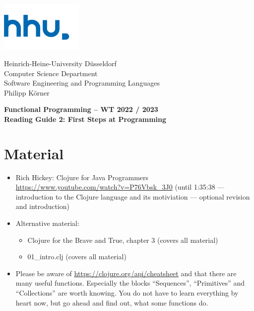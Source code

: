 \documentclass[11pt,a4paper]{article}
\begin{document}
\begin{minipage}[b]{\textwidth}
	\parbox[t]{5cm}{%
		\includegraphics[width=4cm]{unilogo}
		\hfill
	}
	\parbox[b]{11cm}{%
		Heinrich-Heine-University D\"usseldorf\\
		Computer Science Department\\
		Software Engineering and Programming Languages\\
		Philipp K\"orner
	}
\end{minipage}
\begin{center}
	\bf
	Functional Programming -- WT 2022 / 2023\\
	Reading Guide 2: First Steps at Programming
\end{center}

\pagestyle{empty}

\section{Material} 

\begin{itemize}
    \item Rich Hickey: Clojure for Java Programmers \url{https://www.youtube.com/watch?v=P76Vbsk_3J0} (until 1:35:38 --- introduction to the Clojure language and its motiviation --- optional revision and introduction)
    \item Alternative material:
        \begin{itemize}
            \item Clojure for the Brave and True, chapter 3 (covers all material)
            \item 01\_intro.clj (covers all material)
        \end{itemize}
    \item Please be aware of \url{https://clojure.org/api/cheatsheet} and that there are many useful functions.
        Especially the blocks ``Sequences'', ``Primitives'' and ``Collections'' are worth knowing.
        You do not have to learn everything by heart now, but go ahead and find out, what some functions do.
\end{itemize}
\end{document}
